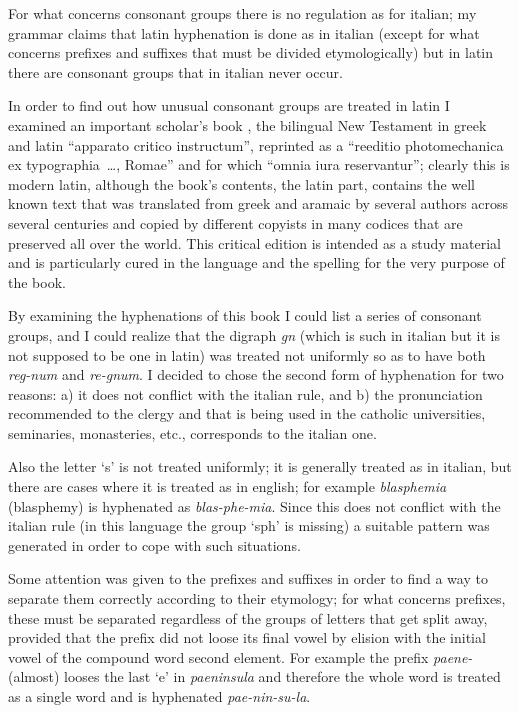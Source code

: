 For what concerns consonant groups there is no regulation as for italian; my
grammar \cite{manna} claims that latin hyphenation is  done  as  in  italian
(except  for  what  concerns  prefixes  and  suffixes  that  must be divided
etymologically) but in latin there are  consonant  groups  that  in  italian
never occur.

In  order  to  find  out how unusual consonant groups are treated in latin I
examined  an  important  scholar's  book  \cite{merk},  the  bilingual   New
Testament in greek and latin ``apparato critico instructum'', reprinted as a
``reeditio  photomechanica  ex  typographia~\dots,  Romae''  and  for  which
``omnia  iura  reservantur'';  clearly  this  is  modern latin, although the
book's contents, the latin part, contains  the  well  known  text  that  was
translated  from  greek  and  aramaic  by  several  authors  across  several
centuries and  copied  by  different  copyists  in  many  codices  that  are
preserved  all  over the world. This critical edition is intended as a study
material and is particularly cured in the language and the spelling for  the
very purpose of the book.

By  examining  the  hyphenations  of  this  book  I  could  list a series of
consonant groups, and I could realize that the digraph {\it  gn}  (which  is
such  in  italian but it is not supposed to be one in latin) was treated not
uniformly so as to have both {\it reg-num} and {\it re-gnum}. I  decided  to
chose  the  second  form  of  hyphenation  for  two  reasons: a) it does not
conflict with the italian rule, and b) the pronunciation recommended to  the
clergy  and  that  is  being  used in the catholic universities, seminaries,
monasteries, etc., corresponds to the italian one.

Also  the letter `s' is not treated uniformly; it is generally treated as in
italian, but there are cases where it is treated as in english; for  example
{\it blasphemia} (blasphemy) is hyphenated as {\it blas-phe-mia}. Since this
does not conflict with the italian rule (in this language the group `sph' is
missing)  a  suitable  pattern  was  generated  in  order  to cope with such
situations.


Some attention was given to the prefixes and suffixes in order to find a way
to separate them correctly according to their etymology; for  what  concerns
prefixes,  these  must be separated regardless of the groups of letters that
get split away, provided that the prefix did not loose its  final  vowel  by
elision  with  the  initial  vowel  of the compound word second element. For
example the prefix {\it  paene-}  (almost)  looses  the  last  `e'  in  {\it
paeninsula}  and therefore the whole word is treated as a single word and is
hyphenated {\it pae-nin-su-la}.

